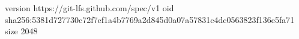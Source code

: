 version https://git-lfs.github.com/spec/v1
oid sha256:5381d727730c72f7ef1a4b7769a2d845d0a07a57831c4dc0563823f136e5fa71
size 2048
